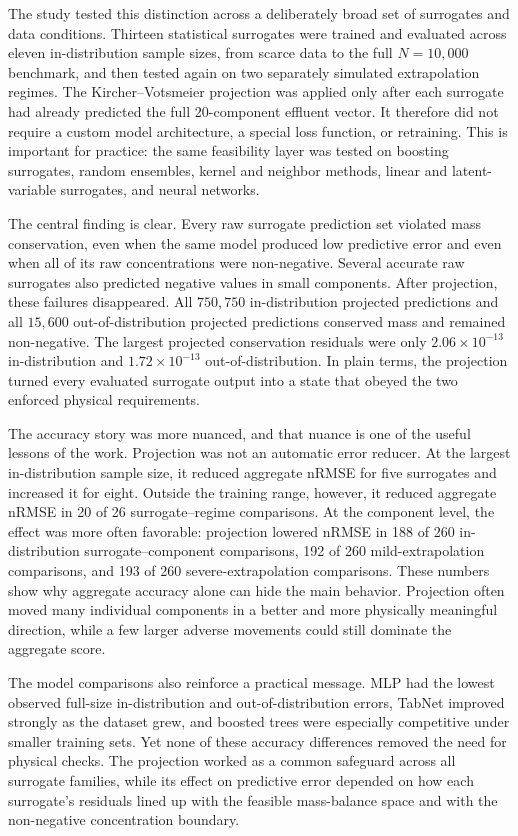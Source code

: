 \documentclass[a4paper,fleqn]{cas-sc}
\begin{document}
The study tested this distinction across a deliberately broad set of surrogates and data conditions. Thirteen statistical surrogates were trained and evaluated across eleven in-distribution sample sizes, from scarce data to the full $N=10{,}000$ benchmark, and then tested again on two separately simulated extrapolation regimes. The Kircher--Votsmeier projection was applied only after each surrogate had already predicted the full 20-component effluent vector. It therefore did not require a custom model architecture, a special loss function, or retraining. This is important for practice: the same feasibility layer was tested on boosting surrogates, random ensembles, kernel and neighbor methods, linear and latent-variable surrogates, and neural networks.

The central finding is clear. Every raw surrogate prediction set violated mass conservation, even when the same model produced low predictive error and even when all of its raw concentrations were non-negative. Several accurate raw surrogates also predicted negative values in small components. After projection, these failures disappeared. All $750{,}750$ in-distribution projected predictions and all $15{,}600$ out-of-distribution projected predictions conserved mass and remained non-negative. The largest projected conservation residuals were only $2.06\times10^{-13}$ in-distribution and $1.72\times10^{-13}$ out-of-distribution. In plain terms, the projection turned every evaluated surrogate output into a state that obeyed the two enforced physical requirements.

The accuracy story was more nuanced, and that nuance is one of the useful lessons of the work. Projection was not an automatic error reducer. At the largest in-distribution sample size, it reduced aggregate nRMSE for five surrogates and increased it for eight. Outside the training range, however, it reduced aggregate nRMSE in 20 of 26 surrogate--regime comparisons. At the component level, the effect was more often favorable: projection lowered nRMSE in 188 of 260 in-distribution surrogate--component comparisons, 192 of 260 mild-extrapolation comparisons, and 193 of 260 severe-extrapolation comparisons. These numbers show why aggregate accuracy alone can hide the main behavior. Projection often moved many individual components in a better and more physically meaningful direction, while a few larger adverse movements could still dominate the aggregate score.

The model comparisons also reinforce a practical message. MLP had the lowest observed full-size in-distribution and out-of-distribution errors, TabNet improved strongly as the dataset grew, and boosted trees were especially competitive under smaller training sets. Yet none of these accuracy differences removed the need for physical checks. The projection worked as a common safeguard across all surrogate families, while its effect on predictive error depended on how each surrogate's residuals lined up with the feasible mass-balance space and with the non-negative concentration boundary.
\end{document}
